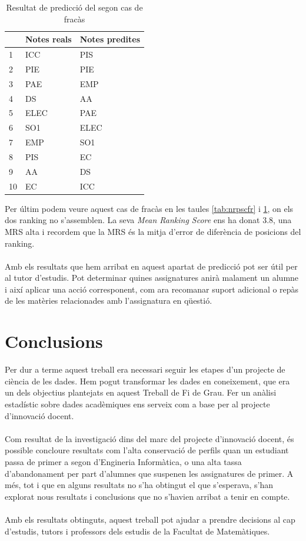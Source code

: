 \documentclass[12pt,a4paper,catalan]{article}
\begin{document}
\begin{table}[h]
\centering
\begin{tabular}{@{}lll@{}}
\toprule
     & Notes reals & Notes predites \\ \midrule
1    & ICC    & PIS       \\
2    & PIE    & PIE      \\
3    & PAE    & EMP       \\
4    & DS     & AA      \\
5    & ELEC   & PAE       \\
6    & SO1    & ELEC        \\
7    & EMP    & SO1       \\
8    & PIS    & EC      \\
9    & AA     & DS       \\
10   & EC     & ICC        \\ \bottomrule
\end{tabular}
\caption{Resultat de predicció del segon cas de fracàs}
\label{tab:rpscfr}
\end{table}

Per últim podem veure aquest cas de fracàs en les taules \ref{tab:nrpscfr} i \ref{tab:rpscfr}, on els dos ranking no s'assemblen. La seva \textit{Mean Ranking Score} ens ha donat 3.8, una MRS alta i recordem que la MRS és la mitja d'error de diferència de posicions del ranking.
\\
\\
Amb els resultats que hem arribat en aquest apartat de predicció pot ser útil per al tutor d'estudis. Pot determinar quines assignatures anirà malament un alumne i així aplicar una acció corresponent, com ara recomanar suport adicional o repàs de les matèries relacionades amb l'assignatura en qüestió.

\newpage
\section{Conclusions}
Per dur a terme aquest treball era necessari seguir les etapes d'un projecte de ciència de les dades. Hem pogut transformar les dades en coneixement, que era un dels objectius plantejats en aquest Treball de Fi de Grau. Fer un anàlisi estadístic sobre dades acadèmiques ens serveix com a base per al projecte d'innovació docent.
\\
\\
Com resultat de la investigació dins del marc del projecte d'innovació docent, és possible concloure resultats com l'alta conservació de perfils quan un estudiant passa de primer a segon d'Engineria Informàtica, o una alta tassa d'abandonament per part d'alumnes que suspenen les assignatures de primer. A més, tot i que en alguns resultats no s'ha obtingut el que s'esperava, s'han explorat nous resultats i conclusions que no s'havien arribat a tenir en compte.
\\
\\
Amb els resultats obtinguts, aquest treball pot ajudar a prendre decisions al cap d'estudis, tutors i professors dels estudis de la Facultat de Matemàtiques.
\end{document}
